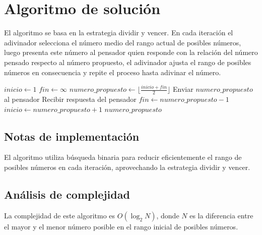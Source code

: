 \documentclass[twoside,spanish]{elsarticle}
\begin{document}
\section{Algoritmo de solución}
El algoritmo se basa en la estrategia dividir y vencer. En cada iteración el adivinador selecciona el número medio del rango actual de posibles números, luego presenta este número al pensador quien responde con la relación del número pensado respecto al número propuesto, el adivinador ajusta el rango de posibles números en consecuencia y repite el proceso hasta adivinar el número.

\begin{algorithm}[H]
\begin{algorithmic}[1]
    \State $inicio \gets 1$
    \State $fin \gets \infty$
        \State $numero\_propuesto \gets \lfloor \frac{inicio + fin}{2} \rfloor$
        \State Enviar $numero\_propuesto$ al pensador
        \State Recibir respuesta del pensador
            \State $fin \gets numero\_propuesto - 1$
            \State $inicio \gets numero\_propuesto + 1$
        \Else
            \State \Return $numero\_propuesto$ 
        \EndIf
    \EndWhile
\EndProcedure
\end{algorithmic}
\end{algorithm}

\subsection{Notas de implementación}
El algoritmo utiliza búsqueda binaria para reducir eficientemente el rango de posibles números en cada iteración, aprovechando la estrategia dividir y vencer.

\subsection{Análisis de complejidad}
La complejidad de este algoritmo es $O(\log_2 N)$, donde $N$ es la diferencia entre el mayor y el menor número posible en el rango inicial de posibles números.
\end{document}
